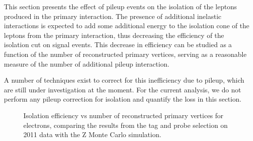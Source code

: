 This section presents the effect of pileup events on the isolation of the leptons 
produced in the primary interaction. The presence of additional inelastic
interactions is expected to add some additional energy to the isolation cone
of the leptons from the primary interaction, thus decreasing the efficiency
of the isolation cut on signal events. This decrease in efficiency can be 
studied as a function of the number of reconstructed primary vertices, serving
as a reasonable measure of the number of additional pileup interaction.

A number of techniques exist to correct for this inefficiency due to pileup,
which are still under investigation at the moment. For the current analysis, 
we do not perform any pileup correction for isolation and quantify the loss
in this section.

\begin{figure}[!htbp]
\begin{center}
\caption{Isolation efficiency vs number of reconstructed primary vertices for electrons, comparing the 
results from the tag and probe selection on 2011 data with the Z Monte Carlo simulation.}
\label{fig:eleIsoEff_TagAndProbe_vs_NVertices}
\end{center}
\end{figure}

